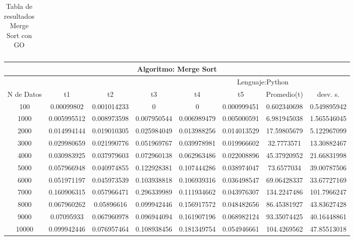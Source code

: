 \documentclass{article}
\begin{document}
\begin{table}[]
\begin{tabular}{|c|c|c|c|c|c|c|c| }
                \end{tabular}
                   \caption{Tabla de resultados Merge Sort con GO}
        \label{tab:mergeSortGO}
    \end{table}
                    \begin{table}[]
        \begin{tabular}{|c|c|c|c|c|c|c|c| }
            \hline
            \multicolumn{8}{|c|}{Algoritmo: Merge Sort} \\ \hline
            \multicolumn{4}{|c|}{} & \multicolumn{4}{c|}{Lenguaje:Python} \\ \hline
              N de Datos &     t1    &  t2         &  t3          &   t4        &    t5     &   Promedio(t)       & desv. s. \\ \hline
                100 &	0.00099802	 &0.001014233	 &0 &	0 &	0.000999451 &	0.602340698	 &0.549895942\\ \hline
                1000 &	0.005995512 &	0.008973598 &	0.007950544 &	0.006989479 &	0.005000591 &	6.981945038	 &1.565546045\\ \hline
                2000 &	0.014994144	 &0.019010305 &	0.025984049 &	0.013988256 &	0.014013529	 &17.59805679	 &5.122967099\\ \hline
                3000 &	0.029980659 &	0.021990776 &	0.051969767 &	0.039978981 &	0.019966602 &	32.7773571	 &13.30882467\\ \hline
                4000	 &0.030983925 &	0.037979603 &	0.072960138 &	0.062963486 &	0.022008896 &	45.37920952	 &21.66831998\\ \hline
                5000 &	0.057966948	 &0.040974855 &	0.122928381 &	0.107444286 &	0.038974047 &	73.6577034	 &39.00787506\\ \hline
                6000 &	0.051971197 &	0.045973539 &	0.103938818 &	0.106939316 &	0.036498547 &	69.06428337	 &33.67727169\\ \hline
                7000 &	0.160906315 &	0.057966471 &	0.296339989 &	0.111934662 &	0.043976307 &	134.2247486	 &101.7966247\\ \hline
                8000 &	0.067960262 &	0.05896616 &	0.099942446 &	0.156917572 &	0.048482656 &	86.45381927 &	43.83627428\\ \hline
                9000 &	0.07095933	 &0.067960978 &	0.096944094 &	0.161907196 &	0.068982124 &	93.35074425 &	40.16448861\\ \hline
                10000 &	0.099942446 &	0.076957464 &	0.108938456 &	0.181349754 &	0.054946661	 &104.4269562	 &47.85513018\\ \hline

\end{tabular}
\end{table}
\end{document}
